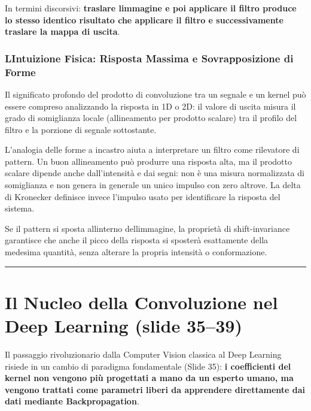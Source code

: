 \documentclass[11pt,a4paper,oneside,openany]{book}
\begin{document}
In termini discorsivi: \textbf{traslare l\textquotesingle immagine e poi applicare il filtro produce lo stesso identico risultato che applicare il filtro e successivamente traslare la mappa di uscita}.

\subsubsection{L\textquotesingle Intuizione Fisica: Risposta Massima e Sovrapposizione di Forme}\label{f02-r378}

Il significato profondo del prodotto di convoluzione tra un segnale e un kernel può essere compreso analizzando la risposta in 1D o 2D: il valore di uscita misura il grado di somiglianza locale (allineamento per prodotto scalare) tra il profilo del filtro e la porzione di segnale sottostante.

L'analogia delle forme a incastro aiuta a interpretare un filtro come rilevatore di pattern. Un buon allineamento può produrre una risposta alta, ma il prodotto scalare dipende anche dall'intensità e dai segni: non è una misura normalizzata di somiglianza e non genera in generale un unico impulso con zero altrove. La delta di Kronecker definisce invece l'impulso usato per identificare la risposta del sistema.

Se il pattern si sposta all\textquotesingle interno dell\textquotesingle immagine, la proprietà di shift-invariance garantisce che anche il picco della risposta si sposterà esattamente della medesima quantità, senza alterare la propria intensità o conformazione.

\begin{center}\rule{0.5\linewidth}{0.5pt}\end{center}

\section{Il Nucleo della Convoluzione nel Deep Learning (slide 35--39)}\label{f02-r388}

Il passaggio rivoluzionario dalla Computer Vision classica al Deep Learning risiede in un cambio di paradigma fondamentale (Slide 35): \textbf{i coefficienti del kernel non vengono più progettati a mano da un esperto umano, ma vengono trattati come parametri liberi da apprendere direttamente dai dati mediante Backpropagation}.
\end{document}
